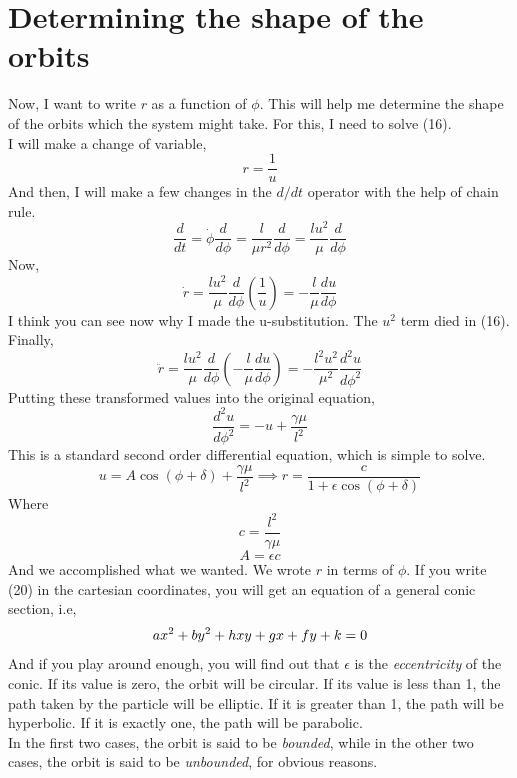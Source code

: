 \documentclass[12pt, letterpaper]{article}
\begin{document}
\section{Determining the shape of the orbits}
Now, I want to write $r$ as a function of $\phi$. This will help me determine the shape of the orbits which the system might take. For this, I need to solve (16). \\
I will make a change of variable, 
\[
r = \frac{1}{u}
\]
And then, I will make a few changes in the $d/dt$ operator with the help of chain rule. 
\[
\frac{d}{dt} = \dot{\phi}\frac{d}{d\phi} = \frac{l}{\mu r^2}\frac{d}{d\phi}=\frac{lu^2}{\mu}\frac{d}{d\phi}
\]
Now, 
\begin{equation}
    \dot{r} = \frac{lu^2}{\mu}\frac{d}{d\phi}\left(\frac{1}{u}\right)=-\frac{l}{\mu}\frac{du}{d\phi}
\end{equation}
I think you can see now why I made the u-substitution. The $u^2$ term died in (16).\\
Finally,
\begin{equation}
    \ddot{r}=\frac{lu^2}{\mu}\frac{d}{d\phi}\left(-\frac{l}{\mu}\frac{du}{d\phi}\right)=-\frac{l^2u^2}{\mu^2}\frac{d^2u}{d\phi^2}
\end{equation}
Putting these transformed values into the original equation,
\begin{equation}
    \frac{d^2 u}{d\phi^2}=-u+\frac{\gamma \mu}{l^2}
\end{equation}
This is a standard second order differential equation, which is simple to solve.
\begin{equation}
    u = A \cos(\phi+\delta)+\frac{\gamma \mu}{l^2}\implies r = \frac{c}{1+\epsilon \cos(\phi+\delta)}
\end{equation}
Where 
\[c = \frac{l^2}{\gamma \mu}\]
\[A = \epsilon c\]
And we accomplished what we wanted. We wrote $r$ in terms of $\phi$. If you write (20) in the cartesian coordinates, you will get an equation of a 
general conic section, i.e,
\begin{equation}
    ax^2+by^2+hxy+gx+fy+k=0 \notag
\end{equation}
And if you play around enough, you will find out that $\epsilon$ is the \textit{eccentricity} of the conic. 
If its value is zero, the orbit will be circular. If its value is less than 1, the path taken by the particle will be elliptic. If it is greater than 1, the path will be hyperbolic. If it is exactly one, the path will be parabolic. \\
In the first two cases, the orbit is said to be \textit{bounded}, while in the other two cases, the orbit is said to be \textit{unbounded}, for obvious reasons.
\end{document}
